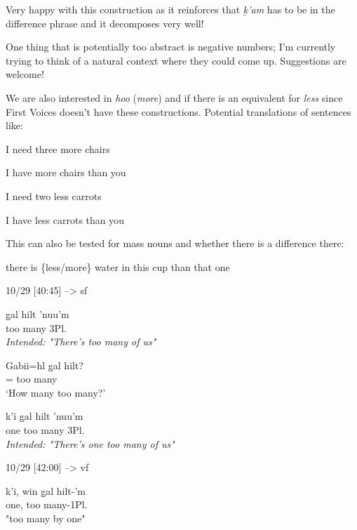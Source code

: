 \documentclass{article}
\begin{document}
Very happy with this construction as it reinforces that \textit{ḵ'am} has to be in the difference phrase and it decomposes very well!

One thing that is potentially too abstract is negative numbers; I'm currently trying to think of a natural context where they could come up. Suggestions are welcome!

We are also interested in \textit{hoo} (\textit{more}) and if there is an equivalent for \textit{less} since First Voices doesn't have these constructions.
Potential translations of sentences like:
\begin{exe}
\ex \begin{xlist}
\item I need three more chairs
\item I have more chairs than you
\item I need two less carrots
\item I have less carrots than you
\end{xlist}
\end{exe}
This can also be tested for mass nouns and whether there is a difference there:
\begin{exe}
\ex there is \{less/more\} water in this cup than that one
\end{exe}

10/29 [40:45] --> sf
\begin{exe}
\ex \begin{xlist}
\item \gll g̱al hilt 'nuu'm\\
too many 3Pl.\Iii{}\\
\textit{Intended: "There's too many of us"}
\item \gll Gabii=hl g̱al hilt?\\
\Mass{}=\Cn{} too many\\
`How many too many?'
\item \gll k'i g̱al hilt 'nuu'm\\
one too many 3Pl.\Iii{}\\
\textit{Intended: "There's one too many of us"}
\end{xlist}
\end{exe}

10/29 [42:00] --> vf
\begin{exe}
\ex \gll k'i, win g̱al hilt-'m\\
one, \Comp{} too many-1Pl.\Iii{}\\
"too many by one"
\end{exe}
\end{document}
